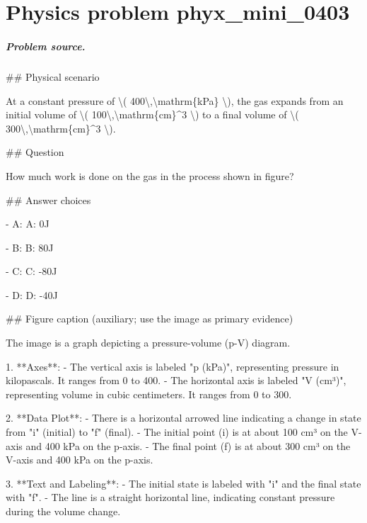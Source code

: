 
\chapter{Physics problem phyx\_mini\_0403}
\label{ch:PhyXMiniProblems_problem_phyx_mini_0403}

\paragraph{Problem source.}
\#\# Physical scenario

At a constant pressure of \textbackslash{}( 400\textbackslash{},\textbackslash{}mathrm\{kPa\} \textbackslash{}), the gas expands from an initial volume of \textbackslash{}( 100\textbackslash{},\textbackslash{}mathrm\{cm\}\textasciicircum{}3 \textbackslash{}) to a final volume of \textbackslash{}( 300\textbackslash{},\textbackslash{}mathrm\{cm\}\textasciicircum{}3 \textbackslash{}).

\#\# Question

How much work is done on the gas in the process shown in figure?

\#\# Answer choices

- A: A: 0J

- B: B: 80J

- C: C: -80J

- D: D: -40J

\#\# Figure caption (auxiliary; use the image as primary evidence)

The image is a graph depicting a pressure-volume (p-V) diagram.

1. **Axes**:
   - The vertical axis is labeled "p (kPa)", representing pressure in kilopascals. It ranges from 0 to 400.
   - The horizontal axis is labeled "V (cm³)", representing volume in cubic centimeters. It ranges from 0 to 300.

2. **Data Plot**:
   - There is a horizontal arrowed line indicating a change in state from "i" (initial) to "f" (final).
   - The initial point (i) is at about 100 cm³ on the V-axis and 400 kPa on the p-axis.
   - The final point (f) is at about 300 cm³ on the V-axis and 400 kPa on the p-axis.

3. **Text and Labeling**:
   - The initial state is labeled with "i" and the final state with "f".
   - The line is a straight horizontal line, indicating constant pressure during the volume change.

